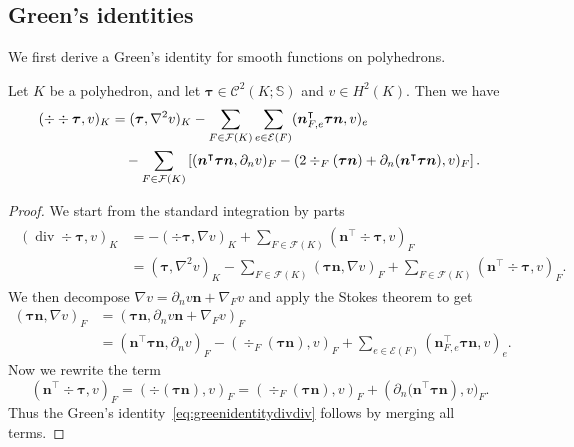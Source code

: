 \subsection{Green's identities}
We first derive a Green's identity for smooth functions on polyhedrons.

\begin{lemma} \label{lm:Green}
Let $K$ be a polyhedron, and let $\boldsymbol  \tau\in \mathcal C^2(K; \mathbb S)$ and $v\in H^2(K)$. 
Then we have
\begin{align}
(\div\div\boldsymbol \tau, v)_K&=(\boldsymbol \tau, \nabla^2v)_K -\sum_{F\in\mathcal F(K)}\sum_{e\in\mathcal E(F)}(\boldsymbol n_{F,e}^{\intercal}\boldsymbol \tau \boldsymbol n, v)_e \notag\\
&\quad - \sum_{F\in\mathcal F(K)}\left[(\boldsymbol  n^{\intercal}\boldsymbol \tau\boldsymbol  n, \partial_n v)_{F} -  ( 2\div_F(\boldsymbol \tau\boldsymbol n)+\partial_n (\boldsymbol  n^{\intercal}\boldsymbol \tau\boldsymbol  n), v)_F\right]. \label{eq:greenidentitydivdiv}
\end{align}
\end{lemma}
\begin{proof}
We start from the standard integration by parts
\begin{align*}
\begin{aligned}
(\operatorname{div}\div \boldsymbol  \tau, v)_{K} &=-(\div\boldsymbol \tau, \nabla v)_{K}+\sum_{F \in \mathcal F(K)}(\boldsymbol  n^{\intercal}\div  \boldsymbol   \tau, v)_F \\
&=\left(\boldsymbol  \tau, \nabla^{2} v\right)_{K}-\sum_{F \in \mathcal F(K)} (\boldsymbol  \tau \boldsymbol  n, \nabla v)_F+\sum_{F \in \mathcal F(K)}(\boldsymbol  n^{\intercal} \div  \boldsymbol   \tau, v)_F.
\end{aligned}
\end{align*}
We then decompose $\nabla v = \partial_nv\boldsymbol n+ \nabla_F v$ and apply the Stokes theorem to get
\begin{align*}
(\boldsymbol  \tau \boldsymbol  n, \nabla v)_F&=(\boldsymbol \tau \boldsymbol n, \partial_nv\boldsymbol n+ \nabla_F v)_F \\
&=(\boldsymbol n^{\intercal}\boldsymbol \tau \boldsymbol n, \partial_nv)_F -( \div_F(\boldsymbol \tau\boldsymbol n),  v)_F + \sum_{e\in\mathcal E(F)} (\boldsymbol n_{F,e}^{\intercal}\boldsymbol \tau \boldsymbol n, v)_e.
\end{align*}
Now we rewrite the term
$$
(\boldsymbol  n^{\intercal}\div  \boldsymbol   \tau, v)_F = (\div  (\boldsymbol  \tau \boldsymbol n), v)_F = ( \div_F(\boldsymbol \tau\boldsymbol n),  v)_F + (\partial_n \boldsymbol (\boldsymbol  n^{\intercal}\boldsymbol \tau\boldsymbol  n),  v)_{F} .
$$
Thus the Green's identity~\eqref{eq:greenidentitydivdiv} follows by merging all terms.
\end{proof}
